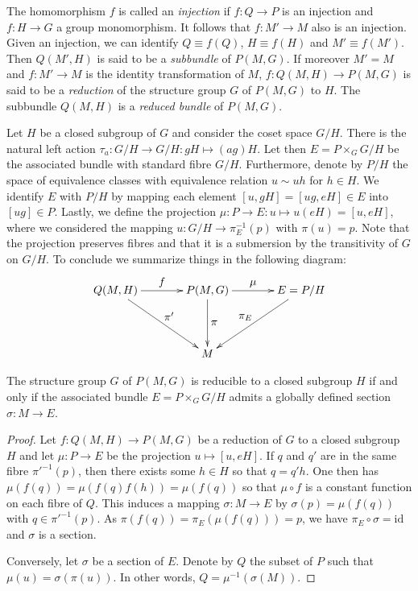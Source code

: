 \documentclass[10pt,reqno]{amsart}
\numberwithin{equation}{section}
\begin{document}
The homomorphism $f$ is called an \emph{injection} if $f : Q \to 
P$ is an injection and $f : H \to G$ a group monomorphism. It 
follows that $f : M' \to M$ also is an injection. Given an 
injection, we can identify $Q \equiv f(Q)$, $H \equiv f(H)$ and 
$M' \equiv f(M')$. Then $Q(M',H)$ is said to be a 
\emph{subbundle} of $P(M,G)$. If moreover $M' = M$ and $f : M' 
\to M$ is the identity transformation of $M$, $f : Q(M,H) \to 
P(M,G)$ is said to be a \emph{reduction} of the structure group 
$G$ of $P(M,G)$ to $H$. The subbundle $Q(M,H)$ is a \emph{reduced 
	bundle} of $P(M,G)$.

\blankline
Let $H$ be a closed subgroup of $G$ and consider the coset space 
$G/H$. There is the natural left action $\tau_a : G/H \to G/H : 
gH \mapsto (ag)H$. Let then $E = P \times_G G/H$ be the 
associated bundle with standard fibre $G/H$. Furthermore, denote 
by $P/H$ the space of equivalence classes with equivalence 
relation $u \sim uh$ for $h \in H$. We identify $E$ with $P/H$ by 
mapping each element $[u,gH] = [ug,eH] \in E$ into $[ug] \in P$.  
Lastly, we define the projection $\mu : P \to E : u \mapsto u(eH) 
= [u,eH]$, where we considered the mapping $u : G/H \to 
\pi^{-1}_E(p)$ with $\pi(u) = p$. Note that the projection 
preserves fibres and that it is a submersion by the transitivity 
of $G$ on $G/H$. To conclude we summarize things in the following 
diagram:
\begin{displaymath}
	\xymatrix@R=1.5cm@C=1.3cm{
		Q(M,H)
			\ar[r]^-*{f}
			\ar[dr]^-*{\pi'}
		& P(M,G)
			\ar[r]^-*{\mu}
			\ar[d]^-*{\pi}
		& E = P/H
			\ar[dl]_-*{\pi_E}
		\\
		& M &
	}
\end{displaymath}

\begin{proposition}
	The structure group $G$ of $P(M,G)$ is reducible to a closed 
	subgroup $H$ if and only if the associated bundle $E = P 
	\times_G G/H$ admits a globally defined section $\sigma : M 
	\to E$.
\end{proposition}
\begin{proof}
	Let $f : Q(M,H) \to P(M,G)$ be a reduction of $G$ to a closed 
	subgroup $H$ and let $\mu : P \to E$ be the projection $u 
	\mapsto [u,eH]$. If $q$ and $q'$ are in the same fibre 
	$\pi'^{-1}(p)$, then there exists some $h \in H$ so that 
	$q=q'h$. One then has $\mu(f(q)) = \mu(f(q)f(h)) = \mu(f(q))$ 
	so that $\mu\circ f$ is a constant function on each fibre of 
	$Q$. This induces a mapping $\sigma : M \to E$ by $\sigma(p) = 
	\mu(f(q))$ with $q \in \pi'^{-1}(p)$. As $\pi(f(q)) = 
	\pi_E(\mu(f(q))) = p$, we have $\pi_E \circ \sigma = 
	\mathrm{id}$ and $\sigma$ is a section.

	Conversely, let $\sigma$ be a section of $E$. Denote by $Q$ 
	the subset of $P$ such that $\mu(u) = \sigma(\pi(u))$. In 
	other words, $Q = \mu^{-1}(\sigma(M))$.
\end{proof}
\end{document}
